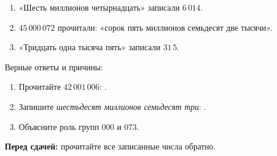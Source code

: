 \begin{warningbox}
  \begin{enumerate}[label=\textbf{\arabic*.}]
    \item «Шесть миллионов четырнадцать» записали \(6\,014\).
    \item \(45\,000\,072\) прочитали: «сорок пять миллионов семьдесят две
      тысячи».
    \item «Тридцать одна тысяча пять» записали \(31\,5\).
  \end{enumerate}
  Верные ответы и причины:
\end{warningbox}

\begin{checkpointbox}[5. Итог]
  \begin{enumerate}[label=\textbf{\arabic*.}]
    \item Прочитайте \(42\,001\,006\): \answerblank[78mm].
    \item Запишите \emph{шестьдесят миллионов семьдесят три}:
      \answerblank[43mm].
    \item Объясните роль групп \(000\) и \(073\).
  \end{enumerate}
  \textbf{Перед сдачей:} прочитайте все записанные числа обратно.
\end{checkpointbox}
